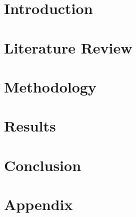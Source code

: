 \documentclass[edeposit,fullpage]{uiucthesis2018}
\begin{document}
\tableofcontents
\listoftables
\listoffigures


\pagebreak
\mainmatter

\chapter{Introduction}


\chapter{Literature Review}


\chapter{Methodology}


\chapter{Results}


\chapter{Conclusion}


\chapter*{Appendix}


\backmatter
\nocite{*}


\end{document}
